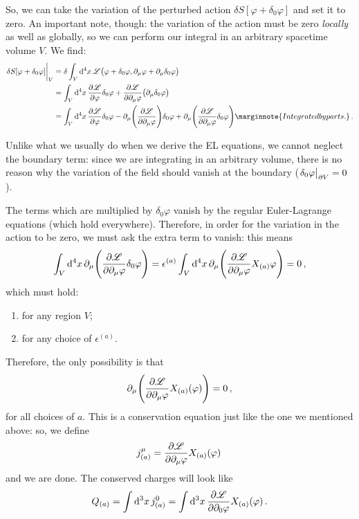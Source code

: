\documentclass[main.tex]{subfiles}
\begin{document}
So, we can take the variation of the perturbed action \(\delta S[\varphi + \delta_0 \varphi ]\) and set it to zero. An important note, though: the variation of the action must be zero \emph{locally} as well as globally, so we can perform our integral in an arbitrary spacetime volume \(V\). We find: 
%
\begin{subequations}
\begin{align}
\eval{\delta S [ \varphi + \delta_0 \varphi ]}_{V} &= \delta  \int_{V} \dd[4]{x} \mathscr{L} \qty(\varphi + \delta_0 \varphi , \partial_{\mu } \varphi + \partial_{\mu } \delta_0 \varphi  )  \\
&= \int_{V} \dd[4]{x} \pdv{\mathscr{L}}{\varphi } \delta_0 \varphi + \pdv{\mathscr{L}}{\partial_{\mu}\varphi } \qty(\partial_{\mu } \delta_0 \varphi )  \\
&= \int_{V} \dd[4]{x} \pdv{\mathscr{L}}{\varphi } \delta_0 \varphi - \partial_{\mu } \qty(\pdv{\mathscr{L}}{\partial_{\mu}\varphi } ) \delta_0 \varphi  + \partial_{\mu } \qty( \pdv{\mathscr{L}}{\partial_{\mu } \varphi } \delta_0 \varphi ) \marginnote{Integrated by parts.}
\,.
\end{align}
\end{subequations}

Unlike what we usually do when we derive the EL equations, we cannot neglect the boundary term: since we are integrating in an arbitrary volume, there is no reason why the variation of the field should vanish at the boundary (\(\eval{\delta_0 \varphi }_{\partial V} =0\)). 

The terms which are multiplied by \(\delta_0 \varphi \) vanish by the regular Euler-Lagrange equations (which hold everywhere). Therefore, in order for the variation in the action to be zero, we must ask the extra term to vanish: this means 
%
\begin{align}
\int_{V} \dd[4]{x} \partial_{\mu } \qty(\pdv{\mathscr{L}}{\partial_{\mu }\varphi } \delta_0 \varphi ) 
=\epsilon^{(a)} \int_{V} \dd[4]{x} \partial_{\mu } \qty( \pdv{\mathscr{L}}{\partial_{\mu } \varphi } X_{(a)} \varphi )
= 0
\,,
\end{align}
%
which must hold: 
\begin{enumerate}
    \item for any region \(V\);
    \item for any choice of \(\epsilon^{(a)}\).
\end{enumerate}

Therefore, the only possibility is that 
%
\begin{align}
\partial_{\mu  }\qty( \pdv{\mathscr{L}}{\partial_{\mu } \varphi } X_{(a)} (\varphi) ) = 0 
\,,
\end{align}
%
for all choices of \(a\). This is a conservation equation just like the one we mentioned above: so, we define 
%
\begin{align}
j^{\mu }_{(a)} = \pdv{\mathscr{L}}{\partial_{\mu } \varphi } X_{(a)} (\varphi)
\,
\end{align}
%
and we are done.
The conserved charges will look like 
%
\begin{align}
Q_{(a)} = \int \dd[3]{x} j^{0}_{(a)} = \int \dd[3]{x} \pdv{\mathscr{L}}{\partial_{0} \varphi } X_{(a)} (\varphi )
\,.
\end{align}
\end{document}
